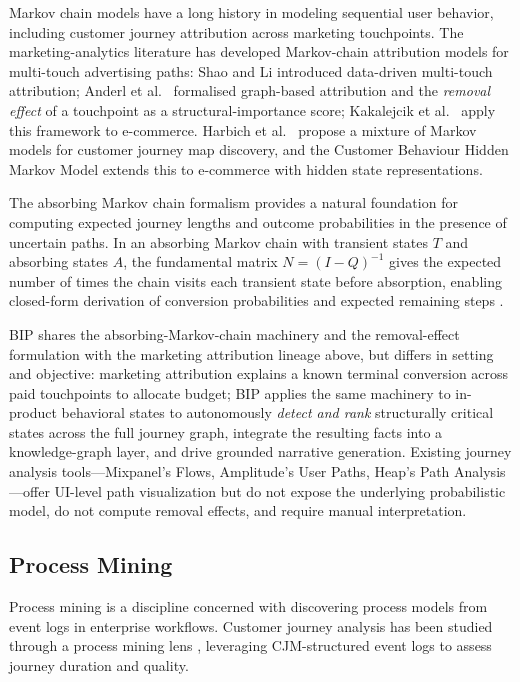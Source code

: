 \documentclass[12pt, a4paper]{article}
\begin{document}
Markov chain models have a long history in modeling sequential user behavior, including customer journey attribution across marketing touchpoints. The marketing-analytics literature has developed Markov-chain attribution models for multi-touch advertising paths: Shao and Li \cite{shao2011} introduced data-driven multi-touch attribution; Anderl et al.\ \cite{anderl2016} formalised graph-based attribution and the \emph{removal effect} of a touchpoint as a structural-importance score; Kakalejcik et al.\ \cite{kakalejcik2022} apply this framework to e-commerce. Harbich et al.\ \cite{harbich2017} propose a mixture of Markov models for customer journey map discovery, and the Customer Behaviour Hidden Markov Model \cite{wang2022} extends this to e-commerce with hidden state representations.

The absorbing Markov chain formalism provides a natural foundation for computing expected journey lengths and outcome probabilities in the presence of uncertain paths. In an absorbing Markov chain with transient states $T$ and absorbing states $A$, the fundamental matrix $N = (I - Q)^{-1}$ gives the expected number of times the chain visits each transient state before absorption, enabling closed-form derivation of conversion probabilities and expected remaining steps \cite{kemeny1960}.

BIP shares the absorbing-Markov-chain machinery and the removal-effect formulation with the marketing attribution lineage above, but differs in setting and objective: marketing attribution explains a known terminal conversion across paid touchpoints to allocate budget; BIP applies the same machinery to in-product behavioral states to autonomously \emph{detect and rank} structurally critical states across the full journey graph, integrate the resulting facts into a knowledge-graph layer, and drive grounded narrative generation. Existing journey analysis tools---Mixpanel's Flows, Amplitude's User Paths, Heap's Path Analysis---offer UI-level path visualization but do not expose the underlying probabilistic model, do not compute removal effects, and require manual interpretation.

\subsection{Process Mining}

Process mining \cite{vanderaalst2016} is a discipline concerned with discovering process models from event logs in enterprise workflows. Customer journey analysis has been studied through a process mining lens \cite{bernard2017}, leveraging CJM-structured event logs to assess journey duration and quality.
\end{document}
